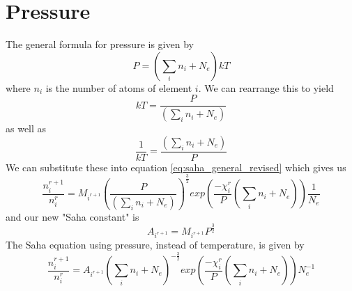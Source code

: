 \documentclass{article}
\begin{document}
	\section{Pressure}
		The general formula for pressure is given by
		\begin{equation} \label{eq:pressure_general}
			P = \left( \sum_i{n_i} + N_e \right) k T
		\end{equation}
		where $n_i$ is the number of atoms of element $i$. We can rearrange this to yield
		\begin{equation} \label{eq:pressure_kT}
			kT = \frac{P}{\left( \displaystyle \sum_i{n_i} + N_e \right)}
		\end{equation}
		as well as
		\begin{equation} \label{eq:pressure_1_kT}
			\frac{1}{kT} = \frac{\left( \displaystyle \sum_i{n_i} + N_e \right)}{P}
		\end{equation}
		We can substitute these into equation \ref{eq:saha_general_revised} which gives us
		\begin{equation} \label{eq:saha_pressure}
			\frac{n^{r+1}_i}{n^r_i} = M_{i^{r+1}} 
				\left(\frac{P}{\left( \displaystyle \sum_i{n_i} + N_e \right)}\right)^\frac{3}{2} 
				exp\left(\frac{-\chi^r_i}{P} \left(\displaystyle\sum_i{n_i} + N_e \right)\right)
				\frac{1}{N_e}
		\end{equation}
		and our new "Saha constant" is 
		\begin{equation} \label{eq:saha_constant_pressure}
			A_{i^{r+1}} = M_{i^{r+1}} P^\frac{3}{2}
		\end{equation}
		The Saha equation using pressure, instead of temperature, is given by
		\begin{equation} \label{eq:saha_pressure_revised}
			\frac{n^{r+1}_i}{n^r_i} = A_{i^{r+1}} 
			\left( \displaystyle \sum_i{n_i} + N_e \right)^{-\frac{3}{2}}
				exp\left(\frac{-\chi^r_i}{P} \left(\displaystyle\sum_i{n_i} + N_e \right)\right)
				N_e^{-1}
		\end{equation}

		\newpage
\end{document}
